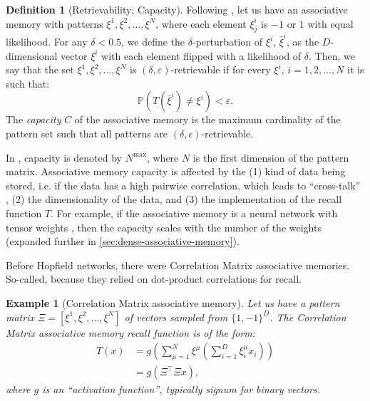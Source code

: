 \documentclass{article}
\newtheorem{example}{Example}[subsection]
\theoremstyle{definition}
\newtheorem{definition}{Definition}[subsection]
\begin{document}
\begin{definition}[Retrievability; Capacity]
  Following \textcite{bao_capacity_2022}, let us have an associative
  memory with patterns
  $\xi^1, \xi^2, \dots, \xi^N$, where each element $\xi^i_j$ is
  $-1$ or $1$ with equal likelihood. For any $\delta < 0.5$, we define
  the $\delta$-perturbation of $\xi^i$, $\bar \xi^i$, as
  the $D$-dimensional vector $\xi^i$ with each element flipped with a likelihood
  of $\delta$. Then, we say that the set $\xi^1, \xi^2, \dots, \xi^N$ is
  $(\delta, \varepsilon)$-retrievable if for every $\xi^i$, $i = 1, 2, \dots, N$
  it is such that:
  \begin{equation}
    \mathbb{P}(T(\bar \xi^i) \neq \xi^i) < \varepsilon.
  \end{equation}
  The \textit{capacity} $C$ of the associative memory is the maximum
  cardinality of the pattern set such that all patterns are $(\delta,
  \epsilon)$-retrievable.
\end{definition}

In \textcite{krotov_dense_2016}, capacity is denoted by $N^{\max}$, where
$N$ is the first dimension of the pattern matrix. Associative memory
capacity is affected by the (1) kind of data being stored,
i.e. if the data
has a high pairwise correlation, which leads to ``cross-talk''
\parencite{kohonen_correlation_1988},
(2) the dimensionality of the data, and (3) the implementation of the
recall function $T$.
For example, if the associative memory is a neural network with
tensor weights \parencite{kelly_memory_2017},
then the capacity scales with the number of the weights
\parencite{little_analytic_1978} (expanded
further in \autoref{sec:dense-associative-memory}).

Before Hopfield networks, there were Correlation Matrix associative memories.
So-called, because they relied on dot-product correlations for recall.
\begin{example}[Correlation Matrix associative
  memory]\label{example:correlation}
  Let us have a pattern matrix $\Xi = [\xi^1, \xi^2, \dots, \xi^N]$ of
  vectors sampled from $\{1, -1\}^D$. The Correlation Matrix associative memory
  recall function is of the form:
  \begin{align}
    T(x) &= g \left(\sum^N_{\mu=1} \xi^\mu \left( \sum^D_{i=1}
    \xi^\mu_i x_i \right)\right) \nonumber \\
    &= g \left( \Xi^\top \Xi x  \right),
  \end{align}
  where $g$ is an ``activation function'', typically \textit{signum}
  for binary vectors.
\end{example}
\end{document}

